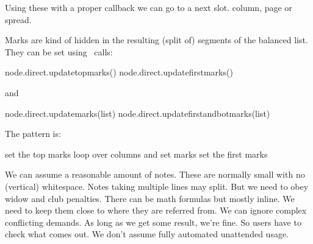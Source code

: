 Using these with a proper callback we can go to a next slot. column, page or
spread.


\stoptitle

\starttitle[title=Activities: marks]

Marks are kind of hidden in the resulting (split of) segments of the
balanced list. They can be set using \LUA\ calls:

\starttyping
node.direct.updatetopmarks()
node.direct.updatefirstmarks()
\stoptyping

and

\starttyping
node.direct.updatemarks(list)
node.direct.updatefirstandbotmarks(list)
\stoptyping

The pattern is:

\startitemize[packed]
\startitem set the top marks \stopitem
\startitem loop over columns and set marks \stopitem
\startitem set the first marks \stopitem
\stopitemize

\stoptitle

\starttitle[title=Activities: inserts]

\startitemize[packed]
\startitem We can assume a reasonable amount of notes. \stopitem
\startitem These are normally small with no (vertical) whitespace. \stopitem
\startitem Notes taking multiple lines may split. \stopitem
\startitem But we need to obey widow and club penalties. \stopitem
\startitem There can be math formulas but mostly inline. \stopitem
\startitem We need to keep them close to where they are referred from. \stopitem
\blank
\startitem We can ignore complex conflicting demands. \stopitem
\startitem As long as we get some result, we're fine. \stopitem
\startitem So users have to check what comes out. \stopitem
\startitem We don't assume fully automated unattended usage. \stopitem
\stopitemize

